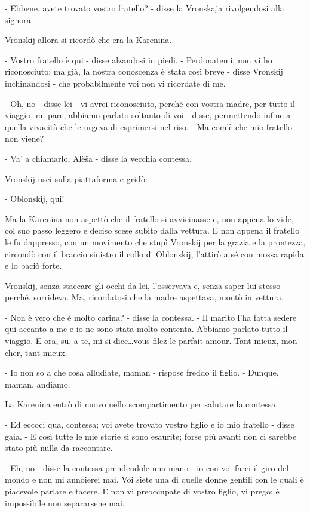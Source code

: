 - Ebbene, avete trovato vostro fratello? - disse la Vronskaja rivolgendosi alla signora. 

Vronskij allora si ricordò che era la Karenina. 

- Vostro fratello è qui - disse alzandosi in piedi. - Perdonatemi, non vi ho riconosciuto; ma già, la nostra conoscenza è stata così breve - disse Vronskij inchinandosi - che probabilmente voi non vi ricordate di me. 

- Oh, no - disse lei - vi avrei riconosciuto, perché con vostra madre, per tutto il viaggio, mi pare, abbiamo parlato soltanto di voi - disse, permettendo infine a quella vivacità che le urgeva di esprimersi nel riso. - Ma com'è che mio fratello non viene? 

- Va' a chiamarlo, Alëša - disse la vecchia contessa. 

Vronskij uscì sulla piattaforma e gridò: 

- Oblonskij, qui! 

Ma la Karenina non aspettò che il fratello si avvicinasse e, non appena lo vide, col suo passo leggero e deciso scese subito dalla vettura. E non appena il fratello le fu dappresso, con un movimento che stupì Vronskij per la grazia e la prontezza, circondò con il braccio sinistro il collo di Oblonskij, l'attirò a sé con mossa rapida e lo baciò forte. 

Vronskij, senza staccare gli occhi da lei, l'osservava e, senza saper lui stesso perché, sorrideva. Ma, ricordatosi che la madre aspettava, montò in vettura. 

- Non è vero che è molto carina? - disse la contessa. - Il marito l'ha fatta sedere qui accanto a me e io ne sono stata molto contenta. Abbiamo parlato tutto il viaggio. E ora, su, a te, mi si dice\ldots{}vous filez le parfait amour. Tant mieux, mon cher, tant mieux. 

- Io non so a che cosa alludiate, maman - rispose freddo il figlio. - Dunque, maman, andiamo. 

La Karenina entrò di nuovo nello scompartimento per salutare la contessa. 

- Ed eccoci qua, contessa; voi avete trovato vostro figlio e io mio fratello - disse gaia. - E così tutte le mie storie si sono esaurite; forse più avanti non ci sarebbe stato più nulla da raccontare. 

- Eh, no - disse la contessa prendendole una mano - io con voi farei il giro del mondo e non mi annoierei mai. Voi siete una di quelle donne gentili con le quali è piacevole parlare e tacere. E non vi preoccupate di vostro figlio, vi prego; è impossibile non separarsene mai. 

